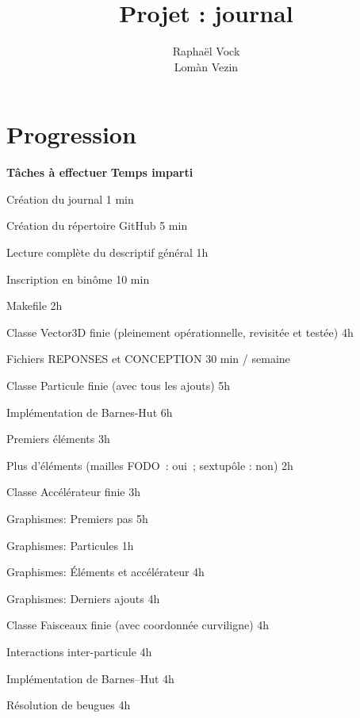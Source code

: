 \documentclass[12pt, letterpaper, twoside]{article}
\title{Projet : journal}
\author{Raphaël Vock \\ Lomàn Vezin}
\newcommand{\cmark}{\ding{51}}%
\newcommand{\done}{\rlap{$\square$}{\raisebox{2pt}{\large\hspace{1pt}\cmark}}%

\hspace{-2.5pt}}
\begin{document}
\maketitle

\section{Progression}

\textbf{Tâches à effectuer} \hfill \textbf{Temps imparti}
\ \linebreak

\begin{todolist}
	\item[\done] Création du journal \hfill 1 min
	\item[\done] Création du répertoire GitHub \hfill 5 min
	\item[\done] Lecture complète du descriptif général \hfill 1h
	\item[\done] Inscription en binôme \hfill 10 min
	\item[\done] Makefile \hfill 2h
	\item[\done] Classe Vector3D finie (pleinement opérationnelle, revisitée et testée) \hfill 4h
	\item[\done] Fichiers REPONSES et CONCEPTION \hfill 30 min / semaine
	\item[\done] Classe Particule finie (avec tous les ajouts) \hfill 5h
	\item[\done] Implémentation de Barnes-Hut \hfill 6h
	\item[\done] Premiers éléments \hfill 3h
	\item[\done] Plus d'éléments (mailles FODO : oui ; sextupôle : non) \hfill 2h
	\item[\done] Classe Accélérateur finie \hfill 3h
	\item[\done] Graphismes: Premiers pas \hfill 5h
	\item[\done] Graphismes: Particules \hfill 1h
	\item[\done] Graphismes: Éléments et accélérateur \hfill 4h
	\item[\done] Graphismes: Derniers ajouts \hfill 4h
	\item[\done] Classe Faisceaux finie (avec coordonnée curviligne) \hfill 4h
	\item[\done] Interactions inter-particule \hfill 4h
	\item[\done] Implémentation de Barnes--Hut \hfill 4h
	\item[\done] Résolution de beugues \hfill 4h
\end{todolist}
\newpage
\end{document}
